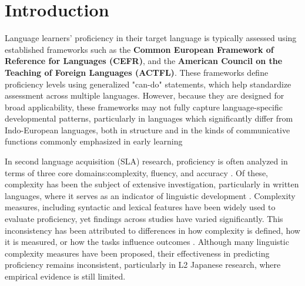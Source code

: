 \chapter{Introduction}










Language learners' proficiency in their target language is typically assessed using established frameworks such as
the \textbf{Common European Framework of Reference for Languages (CEFR)}, and the
\textbf{American Council on the Teaching of Foreign Languages (ACTFL)}. These frameworks define proficiency levels
using generalized "can-do" statements, which help standardize assessment across multiple languages. However,
because they are designed for broad
applicability, these frameworks may
not fully capture language-specific developmental patterns, particularly in languages which significantly differ
from Indo-European languages, both in structure and in the kinds of
communicative functions commonly emphasized in early learning

In second language acquisition (SLA) research, proficiency is often analyzed in terms of three core
domains:complexity, fluency, and accuracy \cite{Skehan1989}. Of these, complexity has been the subject of extensive
investigation, particularly in written languages, where it serves as an indicator of linguistic development
\cite{Lu2010, Lu2011, Ortega2003, Iwashita2006}. Complexity measures, including syntactic and lexical features have
been widely used to evaluate proficiency, yet findings across studies have varied significantly. This inconsistency
has been attributed to differences in how complexity is defined, how it is measured, or how the tasks influence
outcomes \cite{Butle2012,Alexpoulou2017}. Although many linguistic complexity measures have been proposed, their
effectiveness in predicting proficiency remains inconsistent, particularly in L2 Japanese research, where empirical
evidence is still limited.

